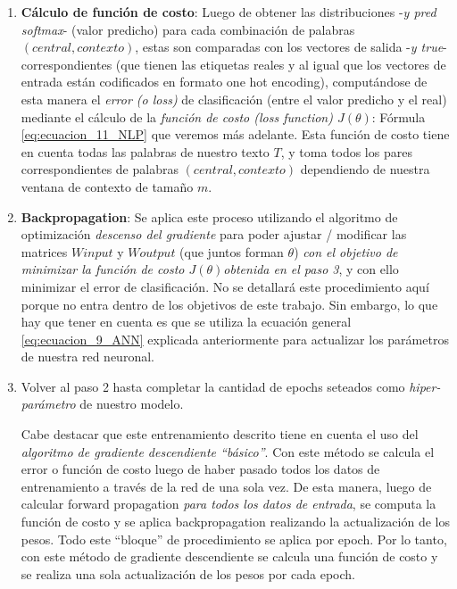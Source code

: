 \documentclass[12pt,a4paper]{article}
\begin{document}
\begin{sloppypar}
\begin{enumerate}
\begin{itemize}
\end{itemize}

\item \textbf{Cálculo de función de costo}:  Luego de obtener las distribuciones -\textit{y pred softmax}- (valor predicho) para cada combinación de palabras $(central, contexto)$, estas son comparadas con los vectores de salida -\textit{y true}- correspondientes (que tienen las etiquetas reales y al igual que los vectores de entrada están codificados en formato one hot encoding), computándose de esta manera el \textit{error (o loss)} de clasificación (entre el valor predicho y el real) mediante el cálculo de la \textit{función de costo (loss function) $J(\theta)$}: Fórmula \ref{eq:ecuacion_11_NLP} que veremos más adelante. Esta función de costo tiene en cuenta todas las palabras de nuestro texto $T$, y toma todos los pares correspondientes de palabras $(central, contexto)$ dependiendo de nuestra ventana de contexto de tamaño $m$.

\item \textbf{Backpropagation}: Se aplica este proceso utilizando el algoritmo de optimización \textit{descenso del gradiente} para poder ajustar / modificar las matrices $W input$ y $W output$  (que juntos forman $\theta$) \textit{con el objetivo de minimizar la función de costo $J(\theta)$obtenida en el paso 3}, y con ello minimizar el error de clasificación. No se detallará este procedimiento aquí porque no entra dentro de los objetivos de este trabajo. Sin embargo, lo que hay que tener en cuenta es que se utiliza la ecuación general  \ref{eq:ecuacion_9_ANN} explicada anteriormente para actualizar los parámetros de nuestra red neuronal. 

\item Volver al paso 2 hasta completar la cantidad de epochs seteados como \textit{hiper-parámetro} de nuestro modelo. 

Cabe destacar que este entrenamiento descrito tiene en cuenta el uso del \textit{algoritmo de gradiente descendiente “básico”}. Con este método se calcula el error o función de costo luego de haber pasado todos los datos de entrenamiento a través de la red de una sola vez. De esta manera, luego de calcular forward propagation \textit{para todos los datos de entrada}, se computa la función de costo y se aplica backpropagation realizando la actualización de los pesos. Todo este “bloque” de procedimiento se aplica por epoch. Por lo tanto, con este método de gradiente descendiente se calcula una función de costo y se realiza una sola actualización de los pesos por cada epoch.


\end{enumerate}
\end{sloppypar}
\end{document}
